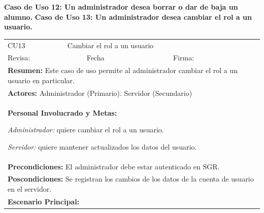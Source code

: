 		\textbf{Caso de Uso 12: Un administrador desea borrar o dar de baja un alumno.}
		\textbf{Caso de Uso 13: Un administrador desea cambiar el rol a un usuario.}
			\begin{longtable}{|l|p{5.5cm}|l|p{2cm}|l|p{1.9cm}|} \hline
					\cellcolor{grisOscuro} CU13 & \multicolumn{4}{|l|}{  \cellcolor{grisOscuro} Cambiar el rol a un usuario} &  \cellcolor{grisClaro}\multirow{2}{1cm}{} \\ \cline{1-5}
					\cellcolor{grisOscuro} Revisa: &  \cellcolor{grisClaro} &  \cellcolor{grisOscuro} Fecha &  \cellcolor{grisClaro} &  \cellcolor{grisOscuro} Firma: & \cellcolor{grisClaro} \\ \hline
					\multicolumn{6}{|p{15cm}|}{ \textbf{Resumen: } Este caso de uso permite al administrador cambiar el rol a un usuario en particular.

					} \\ \hline

					\multicolumn{6}{|p{15cm}|}{ \textbf{Actores: } Administrador (Primario). Servidor (Secundario)

					} \\ \hline

					\multicolumn{6}{|p{15cm}|}{ \textbf{Personal Involucrado y Metas: }
					
					\emph{Administrador:} quiere cambiar el rol a un usuario.

					\emph{Servidor:} quiere mantener actualizados los datos del usuario.

					} \\ \hline

					\multicolumn{6}{|p{15cm}|}{ \textbf{Precondiciones: } El administrador debe estar autenticado en SGR.

					} \\ \hline

					\multicolumn{6}{|p{15cm}|}{ \textbf{Poscondiciones: } Se registran los cambios de los datos de la cuenta de usuario en el servidor.

					} \\ \hline

					\multicolumn{6}{|p{15cm}|}{ \textbf{Escenario Principal: }

}
\end{longtable}
